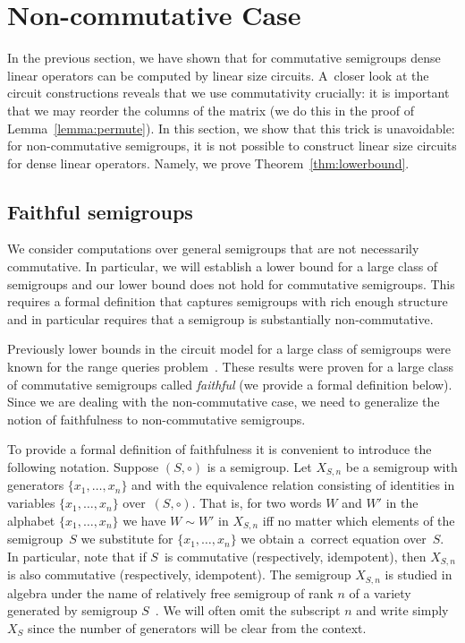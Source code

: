 \documentclass{toc}
\begin{document}



\section{Non-commutative Case}\label{sec-non-commutative}

In the previous section, we have shown that for commutative semigroups dense
linear operators can be computed by linear size circuits. A~closer look at the
circuit constructions reveals that we use commutativity crucially: it is
important that we may reorder the columns of the matrix (we do this in the proof
of Lemma~\ref{lemma:permute}). In this section, we show that this trick is
unavoidable: for non-commutative semigroups, it is not possible to construct
linear size circuits for dense linear operators. Namely, we prove
Theorem~\ref{thm:lowerbound}.

\lowerthm*

\subsection{Faithful semigroups}

We consider computations over general semigroups that are not necessarily
commutative. In particular, we will establish a lower bound for a large class of
semigroups and our lower bound does not hold for commutative semigroups. This
requires a formal definition that captures semigroups with rich enough structure
and in particular requires that a semigroup is substantially non-commutative.

Previously lower bounds in the circuit model for a large class of semigroups
were known for the range queries
problem~\cite{DBLP:conf/stoc/Yao82,DBLP:journals/ijcga/ChazelleR91}. These
results were proven for a large class of commutative semigroups called
\emph{faithful} (we provide a formal definition below). Since we are dealing
with the non-commutative case, we need to generalize the notion of faithfulness
to non-commutative semigroups.

To provide a formal definition of faithfulness it is convenient to introduce the
following notation. Suppose $(S, \circ)$ is a
semigroup. Let $X_{S,n}$ be a semigroup with generators $\{x_1,\ldots, x_n\}$
and with the equivalence relation consisting of identities in variables
$\{x_1,\ldots, x_n\}$ over~$(S,\circ)$. That is, for two words $W$ and $W'$ in
the alphabet $\{x_1,\ldots,x_n\}$ we have $W\sim W'$ in $X_{S,n}$ iff no matter
which elements of the semigroup~$S$ we substitute for $\{x_1,\ldots, x_n\}$ we
obtain a~correct equation over~$S$. In particular, note that if $S$~is
commutative (respectively, idempotent), then $X_{S,n}$ is also commutative
(respectively, idempotent).
The semigroup $X_{S,n}$ is studied in algebra under the name of relatively free
semigroup of rank $n$ of a variety generated by semigroup
$S$~\cite{neumann2012varieties}. We will often omit the subscript $n$ and write
simply $X_S$ since the number of generators will be clear from the context.
\end{document}
